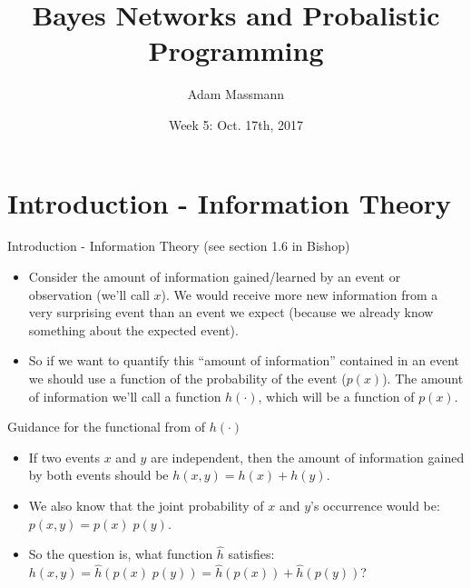\documentclass{beamer}
\title[Your Short Title]{Bayes Networks and Probalistic Programming}
\author{Adam Massmann}
\institute{Water Center NN Meetings}
\date{Week 5: Oct. 17th, 2017}
\begin{document}
\begin{frame}
  \titlepage
\end{frame}


\section{Introduction - Information Theory}

\begin{frame}{Introduction - Information Theory (see section 1.6 in Bishop)}
\begin{itemize}
\item Consider the amount of information gained/learned by an event or observation (we'll call $x$). We would receive more new information from a very surprising event than an event we expect (because we already know something about the expected event).
\item So if we want to quantify this ``amount of information'' contained in an event we should use a function of the probability of the event ($p(x)$). The amount of information we'll call a function $h(\cdot )$, which will be a function of $p(x)$.
\end{itemize}

\end{frame}


\begin{frame}{Guidance for the functional from of $h(\cdot ) $}
\begin{itemize}
\item If two events $x$ and $y$ are independent, then the amount of information gained by both events should be $h(x,y) = h(x) + h(y)$.
\item We also know that the joint probability of $x$ and $y$'s occurrence would be: $p(x,y) = p(x) \; p(y)$.
  \item So the question is, what function $\hat{h}$ satisfies: $h(x,y) = \hat{h}(p(x)\; p(y)) = \hat{h}(p(x)) + \hat{h}(p(y))$?
\end{itemize}

\end{frame}
\end{document}
